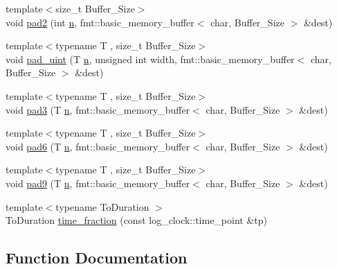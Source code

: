 \begin{DoxyCompactItemize}
\item 
{\footnotesize template$<$size\+\_\+t Buffer\+\_\+\+Size$>$ }\\void \hyperlink{namespacespdlog_1_1details_1_1fmt__helper_ae8d7b70c5b54338c0903cf494b06404a}{pad2} (int \hyperlink{format_8h_a9ab7e5832cef391eb8b1505a601fb215}{n}, fmt\+::basic\+\_\+memory\+\_\+buffer$<$ char, Buffer\+\_\+\+Size $>$ \&dest)
\item 
{\footnotesize template$<$typename T , size\+\_\+t Buffer\+\_\+\+Size$>$ }\\void \hyperlink{namespacespdlog_1_1details_1_1fmt__helper_a569553750f9f2fa7b16c94a56a398de3}{pad\+\_\+uint} (T \hyperlink{format_8h_a9ab7e5832cef391eb8b1505a601fb215}{n}, unsigned int width, fmt\+::basic\+\_\+memory\+\_\+buffer$<$ char, Buffer\+\_\+\+Size $>$ \&dest)
\item 
{\footnotesize template$<$typename T , size\+\_\+t Buffer\+\_\+\+Size$>$ }\\void \hyperlink{namespacespdlog_1_1details_1_1fmt__helper_af739ecce102d47ff08a0f344a96897d9}{pad3} (T \hyperlink{format_8h_a9ab7e5832cef391eb8b1505a601fb215}{n}, fmt\+::basic\+\_\+memory\+\_\+buffer$<$ char, Buffer\+\_\+\+Size $>$ \&dest)
\item 
{\footnotesize template$<$typename T , size\+\_\+t Buffer\+\_\+\+Size$>$ }\\void \hyperlink{namespacespdlog_1_1details_1_1fmt__helper_aefae60b1ebdae78bc8f11c26b36b2cd6}{pad6} (T \hyperlink{format_8h_a9ab7e5832cef391eb8b1505a601fb215}{n}, fmt\+::basic\+\_\+memory\+\_\+buffer$<$ char, Buffer\+\_\+\+Size $>$ \&dest)
\item 
{\footnotesize template$<$typename T , size\+\_\+t Buffer\+\_\+\+Size$>$ }\\void \hyperlink{namespacespdlog_1_1details_1_1fmt__helper_aad467c706932b56929dae091b39c23f3}{pad9} (T \hyperlink{format_8h_a9ab7e5832cef391eb8b1505a601fb215}{n}, fmt\+::basic\+\_\+memory\+\_\+buffer$<$ char, Buffer\+\_\+\+Size $>$ \&dest)
\item 
{\footnotesize template$<$typename To\+Duration $>$ }\\To\+Duration \hyperlink{namespacespdlog_1_1details_1_1fmt__helper_a27585b20ce58cd861f4e37be0057cc41}{time\+\_\+fraction} (const log\+\_\+clock\+::time\+\_\+point \&tp)
\end{DoxyCompactItemize}


\subsection{Function Documentation}
\mbox{\label{namespacespdlog_1_1details_1_1fmt__helper_a1cd64e7ba833d726c77344aa9fb85e6a}} 
